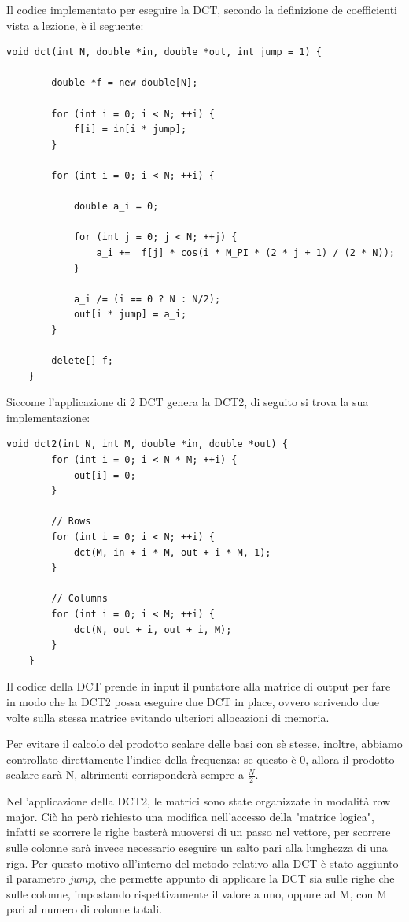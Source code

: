 Il codice implementato per eseguire la DCT, secondo la definizione de coefficienti vista a lezione, è il seguente:


\begin{lstlisting}[gobble=1]
	void dct(int N, double *in, double *out, int jump = 1) {
		
		double *f = new double[N];
		
		for (int i = 0; i < N; ++i) {
			f[i] = in[i * jump];
		}
		
		for (int i = 0; i < N; ++i) {
			
			double a_i = 0;
			
			for (int j = 0; j < N; ++j) {
				a_i +=  f[j] * cos(i * M_PI * (2 * j + 1) / (2 * N));
			}
			
			a_i /= (i == 0 ? N : N/2);
			out[i * jump] = a_i;
		}
		
		delete[] f;
	}

\end{lstlisting}

Siccome l'applicazione di 2 DCT genera la DCT2, di seguito si trova la sua implementazione:

\begin{lstlisting}[gobble=1]
	void dct2(int N, int M, double *in, double *out) {
		for (int i = 0; i < N * M; ++i) {
			out[i] = 0;
		}
		
		// Rows
		for (int i = 0; i < N; ++i) {
			dct(M, in + i * M, out + i * M, 1);
		}
		
		// Columns
		for (int i = 0; i < M; ++i) {
			dct(N, out + i, out + i, M);
		}
	}
\end{lstlisting}

Il codice della DCT prende in input il puntatore alla matrice di output per fare in modo che la DCT2 possa eseguire due DCT in place, ovvero scrivendo due volte sulla stessa matrice evitando ulteriori allocazioni di memoria.

Per evitare il calcolo del prodotto scalare delle basi con sè stesse, inoltre, abbiamo controllato direttamente l'indice della frequenza: se questo è 0, allora il prodotto scalare sarà N, altrimenti corrisponderà sempre a $\frac{N}{2}$.

Nell'applicazione della DCT2, le matrici sono state organizzate in modalità row major. Ciò ha però richiesto una modifica nell'accesso della "matrice logica", infatti se scorrere le righe basterà muoversi di un passo nel vettore, per scorrere sulle colonne sarà invece necessario eseguire un salto pari alla lunghezza di una riga. Per questo motivo all'interno del metodo relativo alla DCT è stato aggiunto il parametro \textit{jump}, che permette appunto di applicare la DCT sia sulle righe che sulle colonne, impostando rispettivamente il valore a uno, oppure ad M, con M pari al numero di colonne totali.

